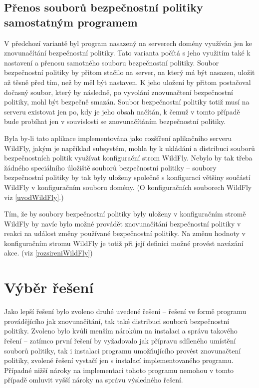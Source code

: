 \subsection{Přenos souborů bezpečnostní politiky samostatným programem} \label{reseniProgramem}

V předchozí variantě byl program nasazený na serverech domény využíván jen ke znovunačítání bezpečnostní politiky.
Tato varianta počítá s jeho využitím také k nastavení a přenosu samotného souboru bezpečnostní politiky.
Soubor bezpečnostní politiky by přitom stačilo na server, na který má být nasazen, uložit až těsně před tím, než by měl být nastaven.
K jeho uložení by přitom postačoval dočasný soubor, který by následně, po vyvolání znovunačtení bezpečnostní politiky, mohl být bezpečně smazán.
Soubor bezpečnostní politiky totiž musí na serveru existovat jen po, kdy je jeho obsah načítán,
k čemuž v tomto případě bude probíhat jen v souvislosti se znovunačítáním bezpečnostní politiky.

Byla by-li tato aplikace implementována jako rozšíření aplikačního serveru WildFly, jakým je například subsystém,
mohla by k ukládání a distribuci souborů bezpečnostních politik využívat konfigurační strom WildFly.
Nebylo by tak třeba žádného speciálního úložiště souborů bezpečnostní politiky -- soubory bezpečnostní politiky
by tak byly uloženy společně s konfigurací většiny součástí WildFly v konfiguračním souboru domény.
(O konfiguračních souborech WildFly viz \ref{uvodWildFly}.)

Tím, že by soubory bezpečnostní politiky byly uloženy v konfiguračním stromě WildFly by navíc bylo možné provádět znovunačítání
bezpečnostní politiky v reakci na událost změny používané bezpečnostní politiky.
Na změnu hodnoty v konfiguračním stromu WildFly je totiž při její definici možné provést navázání akce. (viz \ref{rozsireniWildFly})

\section{Výběr řešení} \label{vyberReseni}

Jako lepší řešení bylo zvoleno druhé uvedené řešení -- řešení ve formě programu provádějícího jak znovunačítání, tak také distribuci souborů bezpečnostní politiky.
Zvoleno bylo kvůli menším nárokům na instalaci a správu takového řešení -- zatímco první řešení by vyžadovalo jak přípravu sdíleného umístění souborů politiky, tak i instalaci programu umožňujícího provést znovunačtení politiky, zvolené řešení vystačí jen s instalací implementovaného programu.
Případné nižší nároky na implementaci tohoto programu nemohou v tomto případě omluvit vyšší nároky na správu výsledného řešení.

